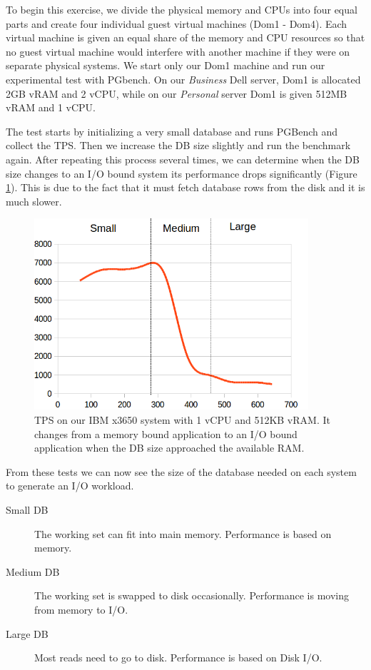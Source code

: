 To begin this exercise, we divide the physical memory and CPUs into four equal parts and create four individual guest virtual machines (Dom1 - Dom4).  
Each virtual machine is given an equal share of the memory and CPU resources so that no guest virtual machine would interfere with another machine if they were on separate physical systems.  
We start only our Dom1 machine and run our experimental test with PGbench.  
On our \emph{Business} Dell server, Dom1 is allocated 2GB vRAM and 2 vCPU, while on our \emph{Personal} server Dom1 is given 512MB vRAM and 1 vCPU.  

The test starts by initializing a very small database and runs PGBench and collect the TPS.  
Then we increase the DB size slightly and run the benchmark again.  
After repeating this process several times, we can determine when the DB size changes to an I/O bound system its performance drops significantly (Figure \ref{smallIO}).  
This is due to the fact that it must fetch database rows from the disk and it is much slower.  

\begin{figure}[!h]
  \begin{center}
  \includegraphics[width=4in]{images/SmallScale.png}
  \caption{TPS on our IBM x3650 system with 1 vCPU and 512KB vRAM. It changes from a memory bound application to an I/O bound application when the DB size approached the available RAM.}
  \label{smallIO}
  \end{center}
\end{figure}

From these tests we can now see the size of the database needed on each system to generate an I/O workload. 
\begin{description}
  \item[Small DB] The working set can fit into main memory.  Performance is based on memory.
  \item[Medium DB] The working set is swapped to disk occasionally. Performance is moving from memory to I/O.
  \item[Large DB] Most reads need to go to disk.  Performance is based on Disk I/O.
\end{description}

